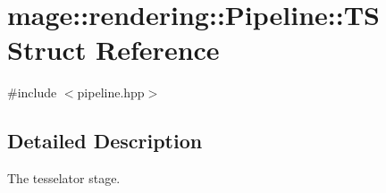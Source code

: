 \hypertarget{structmage_1_1rendering_1_1_pipeline_1_1_t_s}{}\section{mage\+:\+:rendering\+:\+:Pipeline\+:\+:TS Struct Reference}
\label{structmage_1_1rendering_1_1_pipeline_1_1_t_s}


{\ttfamily \#include $<$pipeline.\+hpp$>$}



\subsection{Detailed Description}
The tesselator stage. 